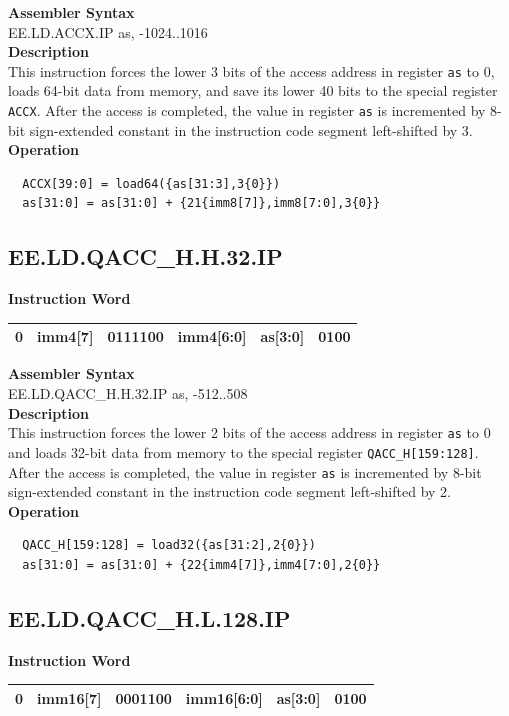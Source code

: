 \textbf{Assembler Syntax} \\
EE.LD.ACCX.IP as, -1024..1016 \\
\textbf{Description} \\
This instruction forces the lower 3 bits of the access address in register \lstinline{as} to 0, loads 64-bit data from memory, and save its lower 40 bits to the special register \lstinline{ACCX}. After the access is completed, the value in register \lstinline{as} is incremented by 8-bit sign-extended constant in the instruction code segment left-shifted by 3.\\
\textbf{Operation}
\begin{lstlisting}
  ACCX[39:0] = load64({as[31:3],3{0}})
  as[31:0] = as[31:0] + {21{imm8[7]},imm8[7:0],3{0}}
\end{lstlisting}

\clearpage
\subsection{EE.LD.QACC\_H.H.32.IP}\label{instruction:EELDQACCHH32IP}
\setlength\tabcolsep{6pt}
\textbf{Instruction Word} \\
\begin{tabular}{|c|c|c|c|c|c|}
	\hline
	0 & imm4[7] & 0111100 & imm4[6:0] & as[3:0] & 0100 \\
	\hline
\end{tabular}

\textbf{Assembler Syntax} \\
EE.LD.QACC\_H.H.32.IP as, -512..508 \\
\textbf{Description} \\
This instruction forces the lower 2 bits of the access address in register \lstinline{as} to 0 and loads 32-bit data from memory to the special register \lstinline{QACC_H[159:128]}. After the access is completed, the value in register \lstinline{as} is incremented by 8-bit sign-extended constant in the instruction code segment left-shifted by 2.\\
\textbf{Operation}
\begin{lstlisting}
  QACC_H[159:128] = load32({as[31:2],2{0}})
  as[31:0] = as[31:0] + {22{imm4[7]},imm4[7:0],2{0}}
\end{lstlisting}

\clearpage
\subsection{EE.LD.QACC\_H.L.128.IP}\label{instruction:EELDQACCHL128IP}
\setlength\tabcolsep{6pt}
\textbf{Instruction Word} \\
\begin{tabular}{|c|c|c|c|c|c|}
	\hline
	0 & imm16[7] & 0001100 & imm16[6:0] & as[3:0] & 0100 \\
	\hline
\end{tabular}

